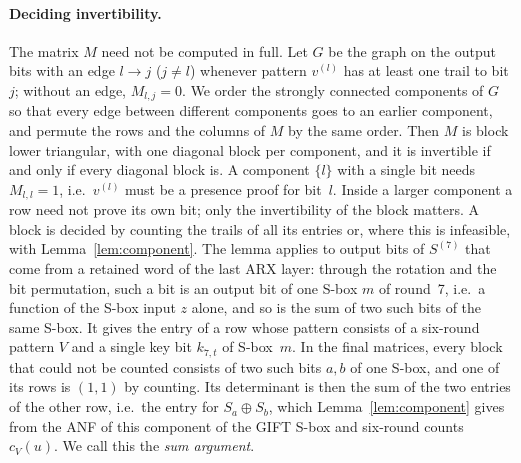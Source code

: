 \documentclass[pdflatex,sn-mathphys-num]{sn-jnl}
\theoremstyle{thmstyleone}
\theoremstyle{thmstylethree}
\theoremstyle{thmstyletwo}
\begin{document}
\paragraph{Deciding invertibility.} The matrix $M$ need not be computed in full. Let $G$ be the graph on the output bits with an edge $l\to j$ ($j\neq l$) whenever pattern $v^{(l)}$ has at least one trail to bit $j$; without an edge, $M_{l,j}=0$. We order the strongly connected components of $G$ so that every edge between different components goes to an earlier component, and permute the rows and the columns of $M$ by the same order. Then $M$ is block lower triangular, with one diagonal block per component, and it is invertible if and only if every diagonal block is. A component $\{l\}$ with a single bit needs $M_{l,l}=1$, i.e.\ $v^{(l)}$ must be a presence proof for bit~$l$. Inside a larger component a row need not prove its own bit; only the invertibility of the block matters. A block is decided by counting the trails of all its entries or, where this is infeasible, with Lemma~\ref{lem:component}. The lemma applies to output bits of $S^{(7)}$ that come from a retained word of the last ARX layer: through the rotation and the bit permutation, such a bit is an output bit of one S-box $m$ of round~7, i.e.\ a function of the S-box input $z$ alone, and so is the sum of two such bits of the same S-box. It gives the entry of a row whose pattern consists of a six-round pattern $V$ and a single key bit $k_{7,t}$ of S-box~$m$. In the final matrices, every block that could not be counted consists of two such bits $a,b$ of one S-box, and one of its rows is $(1,1)$ by counting. Its determinant is then the sum of the two entries of the other row, i.e.\ the entry for $S_a\oplus S_b$, which Lemma~\ref{lem:component} gives from the ANF of this component of the GIFT S-box and six-round counts $c_V(u)$. We call this the \emph{sum argument}.
\end{document}

